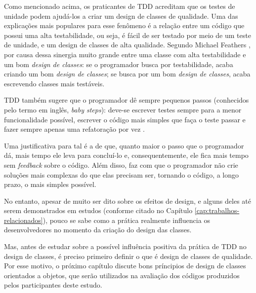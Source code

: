 Como mencionado acima, os praticantes de TDD acreditam que os testes de unidade
podem ajudá-los a criar um design de classes de qualidade. Uma das explicações mais
populares para esse fenômeno é a relação
entre um código que possui uma alta testabilidade, ou seja, é fácil de ser testado
por meio de um teste de unidade, e um design de classes de alta qualidade.
Segundo Michael Feathers \cite{feathers-synergy}, 
por causa dessa sinergia muito
grande entre uma classe com alta testabilidade e um bom \textit{design de classes}: se o
programador busca por testabilidade, acaba criando um bom \textit{design de classes}; se 
busca por um bom \textit{design de classes}, acaba escrevendo classes mais
testáveis.

TDD também sugere que o programador dê sempre pequenos passos (conhecidos pelo termo em
inglês, \textit{baby steps}): deve-se escrever testes sempre para a menor
funcionalidade possível, escrever o código mais simples que faça o teste passar
e fazer sempre apenas uma refatoração por vez \cite{TDDByExample}.

Uma justificativa para tal é a de que, quanto maior o passo que o programador dá, mais
tempo ele leva para concluí-lo e, consequentemente, ele fica mais tempo
sem \textit{feedback} sobre o código. Além disso, faz com que o programador não crie
soluções mais complexas do que elas precisam ser, tornando o código, a longo
prazo, o mais simples possível.

No entanto, apesar de muito ser dito sobre os efeitos de design, e alguns deles
até serem demonstrados em estudos (conforme citado no Capítulo \ref{cap:trabalhos-relacionados}), 
pouco se sabe como a prática realmente influencia os desenvolvedores no momento da criação do
design das classes.

Mas, antes de estudar sobre a possível influência positiva da prática de TDD no design de classes,
é preciso primeiro definir o que é design de classes de qualidade. Por esse motivo, o 
próximo capítulo
discute bons príncipios de design de classes orientados a objetos, que serão utilizados
na avaliação dos códigos produzidos pelos participantes deste estudo.